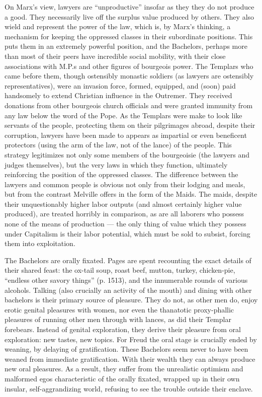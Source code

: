 \documentclass[man,12pt,natbib]{apa6}
\begin{document}
On Marx's view, lawyers are ``unproductive'' insofar as they they do not
produce a good. They necessarily live off the surplus value produced by others.
They also wield and represent the power of the law, which is, by Marx's
thinking, a mechanism for keeping the oppressed classes in their subordinate
positions. This puts them in an extremely powerful position, and the Bachelors,
perhaps more than most of their peers have incredible social mobility, with
their close associations with M.P.s and other figures of bourgeois power. The
Templars who came before them, though ostensibly monastic soldiers (as lawyers
are ostensibly representatives), were an invasion force, formed, equipped, and
(soon) paid handsomely to extend Christian influence in the Outremer. They
received donations from other bourgeois church officials and were granted
immunity from any law below the word of the Pope. As the Templars were make to
look like servants of the people, protecting them on their pilgrimages abroad,
despite their corruption, lawyers have been made to appears as impartial or
even beneficent protectors (using the arm of the law, not of the lance) of the
people. This strategy legitimizes not only some members of the bourgeoisie (the
lawyers and judges themselves), but the very laws in which they function,
ultimately reinforcing the position of the oppressed classes. The difference
between the lawyers and common people is obvious not only from their lodging
and meals, but from the contrast Melville offers in the form of the Maids. The
maids, despite their unquestionably higher labor outputs (and almost certainly
higher value produced), are treated horribly in comparison, as are all laborers
who possess none of the means of production --- the only thing of value which
they possess under Capitalism is their labor potential, which must be sold to
subsist, forcing them into exploitation.

The Bachelors are orally fixated. Pages are spent recounting the exact details
of their shared feast: the ox-tail soup, roast beef, mutton, turkey,
chicken-pie, ``endless other savory things'' (p. 1513), and the innumerable
rounds of various alcohols. Talking (also crucially an activity of the mouth)
and dining with other bachelors is their primary source of pleasure. They do
not, as other men do, enjoy erotic genital pleasures with women, nor even the
thanatotic proxy-phallic pleasures of running other men through with lances, as
did their Templar forebears. Instead of genital exploration, they derive their
pleasure from oral exploration: new tastes, new topics. For Freud the oral
stage is crucially ended by weaning, by delaying of gratification. These
Bachelors seem never to have been weaned from immediate gratification. With
their wealth they can always produce new oral pleasures. As a result, they
suffer from the unrealistic optimism and malformed egos characteristic of the
orally fixated, wrapped up in their own insular, self-aggrandizing world,
refusing to see the trouble outside their enclave.

\clearpage

\end{document}
